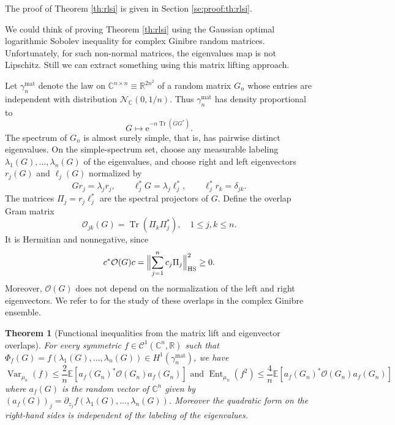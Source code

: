 \documentclass[11pt,reqno]{amsart}
\numberwithin{equation}{section}%
\numberwithin{figure}{section}%
\numberwithin{table}{section}
\theoremstyle{plain}
\newtheorem{theorem}{Theorem}[section]
\theoremstyle{definition}
\begin{document}
The proof of Theorem \ref{th:rlsi} is given in Section \ref{se:proof:th:rlsi}.

We could think of proving Theorem \ref{th:rlsi} using the Gaussian optimal
logarithmic Sobolev inequality for complex Ginibre random matrices.
Unfortunately, for such non-normal matrices, the eigenvalues map is not
Lipschitz. Still we can extract something using this matrix lifting approach.

Let $\gamma_n^{\mathrm{mat}}$ denote the law on
$\mathbb{C}^{n\times n}\equiv\mathbb{R}^{2n^2}$ of a random matrix $G_n$
whose entries are independent with distribution
$\mathcal{N}_{\mathbb{C}}(0,1/n)$. Thus $\gamma_n^{\mathrm{mat}}$ has density
proportional to
\[
  G\longmapsto\mathrm{e}^{-n\operatorname{Tr}(GG^*)}.
\]
The spectrum of $G_n$ is almost surely simple, that is, has pairwise distinct
eigenvalues. On the simple-spectrum set, choose any measurable labeling
$\lambda_1(G),\ldots,\lambda_n(G)$ of the eigenvalues, and choose right and
left eigenvectors $r_j(G)$ and $\ell_j(G)$ normalized by
\begin{equation}\label{eq:left-right-eigenvectors}
  Gr_j=\lambda_jr_j,
  \qquad
  \ell_j^*G=\lambda_j\ell_j^*,
  \qquad
  \ell_j^*r_k=\delta_{jk}.
\end{equation}
The matrices $\Pi_j=r_j\ell_j^*$ are the spectral projectors of $G$. Define
the overlap Gram matrix
\begin{equation}\label{eq:overlap-gram}
  \mathcal{O}_{jk}(G) = \operatorname{Tr}(\Pi_k\Pi_j^*),\quad 1\leq j,k\leq n.
\end{equation}
It is Hermitian and nonnegative, since
\begin{equation}\label{eq:overlap-positive}
  c^*\mathcal{O}(G)c = \Bigl\| \sum_{j=1}^n c_j\Pi_j \Bigr\|_{\mathrm{HS}}^2 \geq0.
\end{equation}
Moreover, $\mathcal{O}(G)$ does not depend on the normalization of the left
and right eigenvectors. We refer to
\cite{BourgadeDubachOverlaps} for the study of these overlaps in the complex
Ginibre ensemble.

\begin{theorem}[Functional inequalities from the matrix lift and eigenvector
  overlaps]\label{th:mlsi}
  For every symmetric $f\in\mathcal{C}^1(\mathbb{C}^n,\mathbb{R})$ such that
  $\Phi_f(G)=f(\lambda_1(G),\ldots,\lambda_n(G))\in
  H^1(\gamma_n^{\mathrm{mat}})$, we have
  \begin{equation}
    \operatorname{Var}_{\mu_n}(f)
    \leq
    \frac{2}{n}
    \mathbb{E}\left[
      a_f(G_n)^*\mathcal{O}(G_n)a_f(G_n)
    \right]
    \text{ and }
    \operatorname{Ent}_{\mu_n}(f^2)
    \leq
    \frac{4}{n}
    \mathbb{E}\left[
      a_f(G_n)^*\mathcal{O}(G_n)a_f(G_n)
    \right]
  \end{equation}
  where $a_f(G)$ is the random vector of $\mathbb{C}^n$ given by
  $(a_f(G))_j=\partial_{z_j}f(\lambda_1(G),\ldots,\lambda_n(G))$. Moreover the
  quadratic form on the right-hand sides is independent of the labeling of the
  eigenvalues.
\end{theorem}
\end{document}
